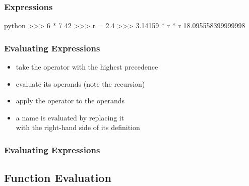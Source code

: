 \documentclass[dvipsnames]{beamer}
\theoremstyle{plain}
\begin{document}
\begin{frame}[fragile]
  \frametitle{Expressions}

  \begin{example}[Python]
    \begin{pygments}{python}
>>> 6 * 7
42
>>> r = 2.4
>>> 3.14159 * r * r
18.095558399999998
    \end{pygments}
  \end{example}
\end{frame}

\begin{frame}
  \frametitle{Evaluating Expressions}

  \begin{itemize}
    \item take the operator with the highest precedence
    \item evaluate its operands (note the recursion)
    \item apply the operator to the operands

    \pause
    \medskip
    \item a name is evaluated by replacing it\\
      with the right-hand side of its definition
  \end{itemize}
\end{frame}

\begin{frame}[fragile]
  \frametitle{Evaluating Expressions}

  \begin{example}

    \pause
    \medskip

    \pause
    \medskip

    \pause
    \medskip
  \end{example}
\end{frame}

\subsection{Function Evaluation}
\end{document}
